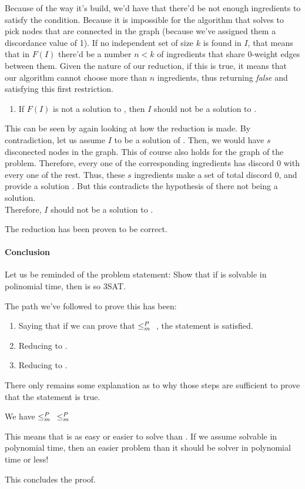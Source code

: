 Because of the way it's build, we'd have that there'd be not enough ingredients to satisfy the condition. Because it is impossible for the algorithm that solves \exc{} to pick nodes that are connected in the graph (because we've assigned them a discordance value of 1). If no independent set of size $k$ is found in $I$, that means that  in $F(I)$ there'd be a number $n < k$ of ingredients that share 0-weight edges between them. Given the nature of our reduction, if this is true, it means that our algorithm cannot choose more than $n$ ingredients, thus returning \textit{false} and satisfying this first restriction.

\begin{enumerate}[resume]
  \item If $F(I)$ is not a solution to \exc{}, then $I$ should not be a solution to \is{}.
\end{enumerate}

This can be seen by again looking at how the reduction is made. By contradiction, let us assume $I$ to be a solution of \is{}. Then, we would have $s$ disconected nodes in the graph. This of course also holds for the graph of the \exc{} problem. Therefore, every one of the corresponding ingredients has discord 0 with every one of the rest. Thus, these $s$ ingredients make a set of total discord 0, and provide a solution \exc{}. But this contradicts the hypothesis of there not being a solution.  
\\
Therefore, $I$ should not be a solution to \is{}.

The reduction has been proven to be correct.

\paragraph{Conclusion}

Let us be reminded of the problem statement: Show that if \exc{} is solvable in polinomial time, then is so 3SAT.

The path we've followed to prove this has been:

\begin{enumerate}
  \item Saying that if we can prove that \tsat{} $\leq_m^P{}$ \exc{}, the statement is satisfied.
  \item Reducing \tsat{} to \is{}.
  \item Reducing \is{} to \exc{}.
\end{enumerate}

There only remains some explanation as to why those steps are sufficient to prove that the statement is true.

We have \tsat{} $\leq_m^P{}$ \is{} $\leq_m^P{}$ \exc{}

This means that \tsat{} is as easy or easier to solve than \exc{}. If we assume \exc{} solvable in polynomial time, then an easier problem than it should be solver in polynomial time or less!

This concludes the proof.
